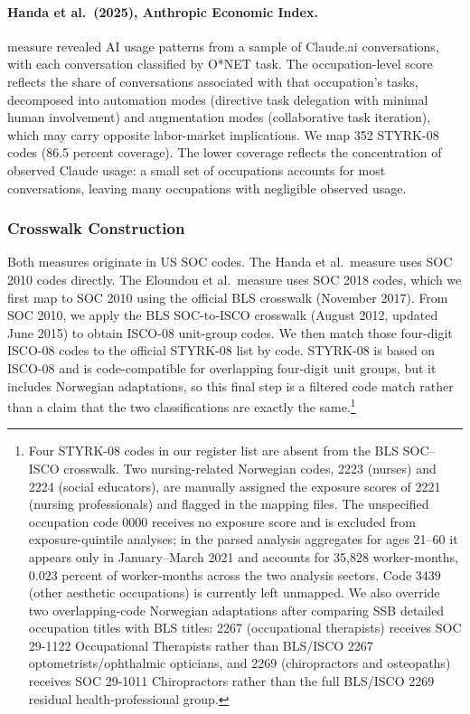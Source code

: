 \documentclass[12pt]{article}
\begin{document}
\paragraph{Handa et al.\ (2025), Anthropic Economic Index.} \citet{handa2025} measure revealed AI usage patterns from a sample of Claude.ai conversations, with each conversation classified by O*NET task. The occupation-level score reflects the share of conversations associated with that occupation's tasks, decomposed into automation modes (directive task delegation with minimal human involvement) and augmentation modes (collaborative task iteration), which may carry opposite labor-market implications. We map 352 STYRK-08 codes (86.5 percent coverage). The lower coverage reflects the concentration of observed Claude usage: a small set of occupations accounts for most conversations, leaving many occupations with negligible observed usage.

\subsubsection*{Crosswalk Construction}

Both measures originate in US SOC codes. The Handa et al.\ measure uses SOC 2010 codes directly. The Eloundou et al.\ measure uses SOC 2018 codes, which we first map to SOC 2010 using the official BLS crosswalk (November 2017). From SOC 2010, we apply the BLS SOC-to-ISCO crosswalk (August 2012, updated June 2015) to obtain ISCO-08 unit-group codes. We then match those four-digit ISCO-08 codes to the official STYRK-08 list by code. STYRK-08 is based on ISCO-08 and is code-compatible for overlapping four-digit unit groups, but it includes Norwegian adaptations, so this final step is a filtered code match rather than a claim that the two classifications are exactly the same.\footnote{Four STYRK-08 codes in our register list are absent from the BLS SOC--ISCO crosswalk. Two nursing-related Norwegian codes, 2223 (nurses) and 2224 (social educators), are manually assigned the exposure scores of 2221 (nursing professionals) and flagged in the mapping files. The unspecified occupation code 0000 receives no exposure score and is excluded from exposure-quintile analyses; in the parsed analysis aggregates for ages 21--60 it appears only in January--March 2021 and accounts for 35,828 worker-months, 0.023 percent of worker-months across the two analysis sectors. Code 3439 (other aesthetic occupations) is currently left unmapped. We also override two overlapping-code Norwegian adaptations after comparing SSB detailed occupation titles with BLS titles: 2267 (occupational therapists) receives SOC 29-1122 Occupational Therapists rather than BLS/ISCO 2267 optometrists/ophthalmic opticians, and 2269 (chiropractors and osteopaths) receives SOC 29-1011 Chiropractors rather than the full BLS/ISCO 2269 residual health-professional group.}
\end{document}

